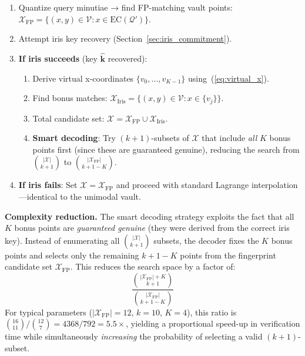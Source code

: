\documentclass[3p,twocolumn]{elsarticle}
\begin{document}
\begin{enumerate}
    \item Quantize query minutiae → find FP-matching vault points: $\mathcal{X}_{\text{FP}} = \{(x,y) \in \mathcal{V} : x \in \text{EC}(\mathcal{Q}')\}$.
    \item Attempt iris key recovery (Section~\ref{sec:iris_commitment}).
    \item \textbf{If iris succeeds} (key $\hat{\mathbf{k}}$ recovered):
    \begin{enumerate}
        \item Derive virtual x-coordinates $\{v_0, \ldots, v_{K-1}\}$ using~(\ref{eq:virtual_x}).
        \item Find bonus matches: $\mathcal{X}_{\text{Iris}} = \{(x,y) \in \mathcal{V} : x \in \{v_j\}\}$.
        \item Total candidate set: $\mathcal{X} = \mathcal{X}_{\text{FP}} \cup \mathcal{X}_{\text{Iris}}$.
        \item \textbf{Smart decoding}: Try $(k{+}1)$-subsets of $\mathcal{X}$ that include \emph{all} $K$ bonus points first (since these are guaranteed genuine), reducing the search from $\binom{|\mathcal{X}|}{k+1}$ to $\binom{|\mathcal{X}_{\text{FP}}|}{k+1-K}$.
    \end{enumerate}
    \item \textbf{If iris fails}: Set $\mathcal{X} = \mathcal{X}_{\text{FP}}$ and proceed with standard Lagrange interpolation---identical to the unimodal vault.
\end{enumerate}

\noindent\textbf{Complexity reduction.} The smart decoding strategy exploits the fact that all $K$ bonus points are \emph{guaranteed genuine} (they were derived from the correct iris key). Instead of enumerating all $\binom{|\mathcal{X}|}{k+1}$ subsets, the decoder fixes the $K$ bonus points and selects only the remaining $k+1-K$ points from the fingerprint candidate set $\mathcal{X}_{\text{FP}}$. This reduces the search space by a factor of:
\begin{equation}
    \frac{\binom{|\mathcal{X}_{\text{FP}}| + K}{k+1}}{\binom{|\mathcal{X}_{\text{FP}}|}{k+1-K}}
    \label{eq:complexity_reduction}
\end{equation}
For typical parameters ($|\mathcal{X}_{\text{FP}}| = 12$, $k = 10$, $K = 4$), this ratio is $\binom{16}{11}/\binom{12}{7} = 4368/792 = 5.5\times$, yielding a proportional speed-up in verification time while simultaneously \emph{increasing} the probability of selecting a valid $(k{+}1)$-subset.
\end{document}
